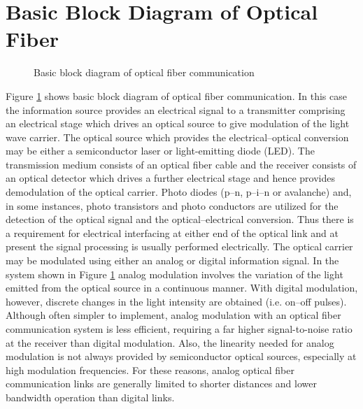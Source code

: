 \documentclass[12pt]{report}
\begin{document}
	\section{Basic Block Diagram of Optical Fiber}
	\begin{figure}[htbp]
		\caption{Basic block diagram of optical fiber communication}
		\label{fig:block}
	\end{figure}
	
	Figure \ref{fig:block} shows basic block diagram of optical fiber communication. In this case the information source provides an electrical signal to a transmitter comprising an electrical stage which drives an optical source to give modulation of the light wave carrier. The optical source which provides the electrical–optical conversion may be either a semiconductor laser or light-emitting diode (LED). The transmission medium consists of an optical fiber cable and the receiver consists of an optical detector which drives a further electrical stage and hence provides demodulation of the optical carrier. Photo diodes (p–n, p–i–n or avalanche) and, in some instances, photo transistors and photo conductors are utilized for the detection of the optical signal and the optical–electrical conversion. Thus there is a requirement for electrical interfacing at either end of the optical link and at present the signal processing is usually performed electrically. The optical carrier may be modulated using either an analog or digital information signal. In the system shown in Figure \ref{fig:block} analog modulation involves the variation of the light emitted from the optical source in a continuous manner. With digital modulation, however, discrete changes in the light intensity are obtained (i.e. on–off pulses). Although often simpler to implement, analog modulation with an optical fiber communication system is less efficient, requiring a far higher signal-to-noise ratio at the receiver than digital modulation. Also, the linearity needed for analog modulation is not always provided by semiconductor optical sources, especially at high modulation frequencies. For these reasons, analog optical fiber communication links are generally limited to shorter distances and lower bandwidth operation than digital links.
\end{document}
